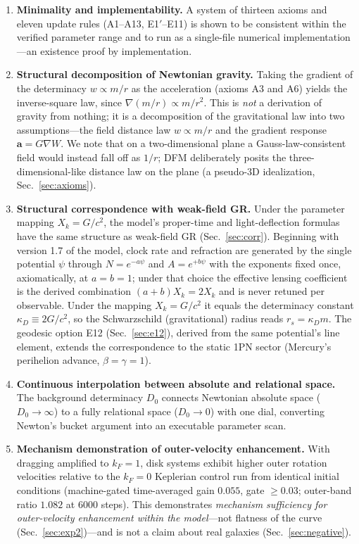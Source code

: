 \documentclass[aps,reprint,amsmath,amssymb,nofootinbib,superscriptaddress,floatfix]{revtex4-2}
\newcommand{\vect}[1]{\bm{#1}}
\newcommand{\Kt}{X_k}
\newcommand{\Dz}{D_0}
\begin{document}
\begin{enumerate}
\item[C1.]{\bf Minimality and implementability.}
A system of thirteen axioms and eleven update rules (A1--A13,
E1$'$--E11) is shown to be consistent within the verified parameter
range and to
run as a single-file numerical implementation---an existence proof by
implementation.

\item[C2.]{\bf Structural decomposition of Newtonian gravity.}
Taking the gradient of the determinacy $w \propto m/r$ as the
acceleration (axioms A3 and A6) yields the inverse-square law, since
$\nabla(m/r) \propto m/r^2$.
This is \emph{not} a derivation of gravity from nothing; it is a
decomposition of the gravitational law into two assumptions---the field
distance law $w \propto m/r$ and the gradient response
$\vect{a} = G\nabla W$.
We note that on a two-dimensional plane a Gauss-law-consistent field
would instead fall off as $1/r$; DFM deliberately posits the
three-dimensional-like distance law on the plane (a pseudo-3D
idealization, Sec.~\ref{sec:axioms}).

\item[C3.]{\bf Structural correspondence with weak-field GR.}
Under the parameter mapping $\Kt = G/c^2$, the model's proper-time and
light-deflection formulas have the same structure as weak-field GR
(Sec.~\ref{sec:corr}).
Beginning with version 1.7 of the model, clock rate and refraction are
generated
by the single potential $\psi$ through $N = e^{-a\psi}$ and
$A = e^{+b\psi}$ with the exponents fixed once, axiomatically, at
$a = b = 1$; under that choice the effective lensing coefficient is the
derived combination $(a+b)\Kt = 2\Kt$ and is never retuned per
observable.
Under the mapping $\Kt = G/c^2$ it equals the determinacy constant
$\kappa_D \equiv 2G/c^2$, so the Schwarzschild (gravitational) radius
reads $r_s = \kappa_D m$.
The geodesic option E12 (Sec.~\ref{sec:e12}), derived from the same
potential's line element, extends the correspondence to the static 1PN
sector (Mercury's perihelion advance, $\beta = \gamma = 1$).

\item[C4.]{\bf Continuous interpolation between absolute and relational
space.}
The background determinacy $\Dz$ connects Newtonian absolute space
($\Dz \to \infty$) to a fully relational space ($\Dz \to 0$) with one
dial, converting Newton's bucket argument into an executable parameter
scan.

\item[C5.]{\bf Mechanism demonstration of outer-velocity enhancement.}
With dragging amplified to $k_F = 1$, disk systems exhibit higher
outer rotation velocities relative to the $k_F = 0$ Keplerian control
run from identical initial conditions (machine-gated time-averaged
gain $0.055$, gate $\ge 0.03$; outer-band ratio $1.082$ at 6000
steps).
This demonstrates \emph{mechanism sufficiency for outer-velocity
enhancement within the model}---not flatness of the curve
(Sec.~\ref{sec:exp2})---and is not a claim about real galaxies
(Sec.~\ref{sec:negative}).


\end{enumerate}
\end{document}
